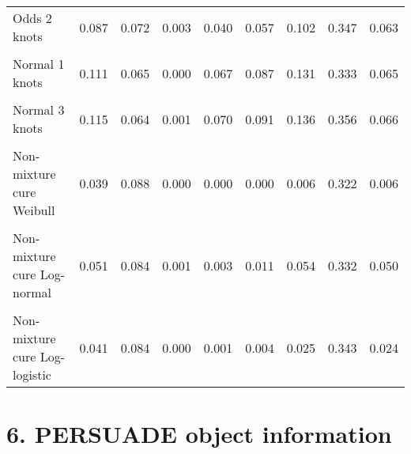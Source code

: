 \documentclass[
]{article}
\begin{document}
\begin{table}[H]
{\begin{tabular}[t]{lrrrrrrrr}
Odds 2 knots & 0.087 & 0.072 & 0.003 & 0.040 & 0.057 & 0.102 & 0.347 & 0.063\\
\cellcolor{gray!10}{Odds 3 knots} & \cellcolor{gray!10}{0.093} & \cellcolor{gray!10}{0.072} & \cellcolor{gray!10}{0.003} & \cellcolor{gray!10}{0.044} & \cellcolor{gray!10}{0.064} & \cellcolor{gray!10}{0.113} & \cellcolor{gray!10}{0.354} & \cellcolor{gray!10}{0.069}\\
Normal 1 knots & 0.111 & 0.065 & 0.000 & 0.067 & 0.087 & 0.131 & 0.333 & 0.065\\
\cellcolor{gray!10}{Normal 2 knots} & \cellcolor{gray!10}{0.101} & \cellcolor{gray!10}{0.067} & \cellcolor{gray!10}{0.000} & \cellcolor{gray!10}{0.058} & \cellcolor{gray!10}{0.076} & \cellcolor{gray!10}{0.116} & \cellcolor{gray!10}{0.336} & \cellcolor{gray!10}{0.059}\\
Normal 3 knots & 0.115 & 0.064 & 0.001 & 0.070 & 0.091 & 0.136 & 0.356 & 0.066\\
\cellcolor{gray!10}{Mixture cure Weibull} & \cellcolor{gray!10}{0.037} & \cellcolor{gray!10}{0.087} & \cellcolor{gray!10}{0.000} & \cellcolor{gray!10}{0.000} & \cellcolor{gray!10}{0.000} & \cellcolor{gray!10}{0.002} & \cellcolor{gray!10}{0.312} & \cellcolor{gray!10}{0.002}\\
Non-mixture cure Weibull & 0.039 & 0.088 & 0.000 & 0.000 & 0.000 & 0.006 & 0.322 & 0.006\\
\cellcolor{gray!10}{Mixture cure Log-normal} & \cellcolor{gray!10}{0.050} & \cellcolor{gray!10}{0.087} & \cellcolor{gray!10}{0.000} & \cellcolor{gray!10}{0.001} & \cellcolor{gray!10}{0.005} & \cellcolor{gray!10}{0.049} & \cellcolor{gray!10}{0.322} & \cellcolor{gray!10}{0.048}\\
Non-mixture cure Log-normal & 0.051 & 0.084 & 0.001 & 0.003 & 0.011 & 0.054 & 0.332 & 0.050\\
\cellcolor{gray!10}{Mixture cure Log-logistic} & \cellcolor{gray!10}{0.044} & \cellcolor{gray!10}{0.085} & \cellcolor{gray!10}{0.001} & \cellcolor{gray!10}{0.001} & \cellcolor{gray!10}{0.005} & \cellcolor{gray!10}{0.032} & \cellcolor{gray!10}{0.341} & \cellcolor{gray!10}{0.031}\\
Non-mixture cure Log-logistic & 0.041 & 0.084 & 0.000 & 0.001 & 0.004 & 0.025 & 0.343 & 0.024\\
\bottomrule
\end{tabular}}
\end{table}

\clearpage

\section{6. PERSUADE object
information}\label{persuade-object-information}
\end{document}
